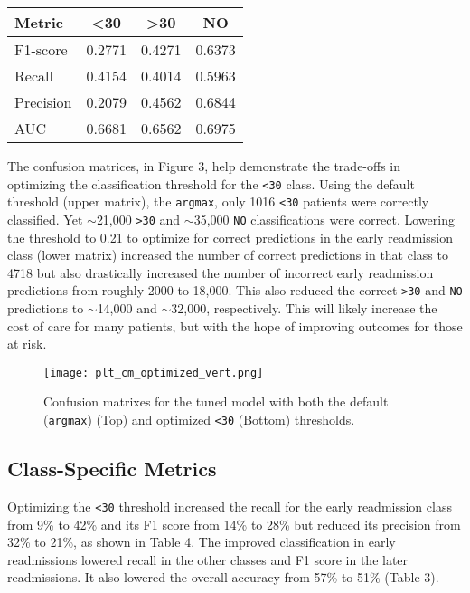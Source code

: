 \documentclass{article}      %
\begin{document}
\begin{table}[h!]
    \centering
    \begin{tabular}{|l|c|c|c|}
    \hline
    \textbf{Metric} & \textbf{\textless 30} & \textbf{\textgreater 30} & \textbf{NO}\\ \hline
    F1-score & 0.2771 & 0.4271 & 0.6373 \\ \hline
    Recall & 0.4154 & 0.4014 & 0.5963 \\ \hline
    Precision & 0.2079 & 0.4562 & 0.6844 \\ \hline
    AUC & 0.6681 & 0.6562 & 0.6975 \\ \hline
    \end{tabular}
    \label{table:class_metrics}
\end{table}

The confusion matrices, in Figure 3, help demonstrate the trade-offs in optimizing the classification threshold for the \texttt{\textless 30} class. Using the default threshold (upper matrix), the \texttt{argmax}, only 1016 \texttt{\textless 30} patients were correctly classified. Yet $\sim$21,000 \texttt{\textgreater 30} and $\sim$35,000 \texttt{NO} classifications were correct. Lowering the threshold to 0.21 to optimize for correct predictions in the early readmission class (lower matrix) increased the number of correct predictions in that class to 4718 but also drastically increased the number of incorrect early readmission predictions from roughly 2000 to 18,000. This also reduced the correct \texttt{\textgreater 30} and \texttt{NO}  predictions to $\sim$14,000 and $\sim$32,000, respectively. 
This will likely increase the cost of care for many patients, but with the hope of improving outcomes for those at risk.

\begin{figure}[h]
    \centering
    \texttt{[image: plt\_cm\_optimized\_vert.png]}
    \caption{Confusion matrixes for the tuned model with both the default (\texttt{argmax}) (Top) and optimized \texttt{\textless 30} (Bottom) thresholds.}
    \label{fig:confusionMatrices}
\end{figure}

\subsection{Class-Specific Metrics}

Optimizing the \texttt{\textless 30} threshold increased the recall for the early readmission class from 9\% to 42\% and its F1 score from 14\% to 28\% but reduced its precision from 32\% to 21\%, as shown in Table 4. The improved classification in early readmissions lowered recall in the other classes and F1 score in the later readmissions. It also lowered the overall accuracy from 57\% to 51\% (Table 3). 
\end{document}
